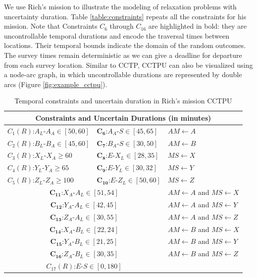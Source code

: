 \documentclass[jair,twoside,11pt,theapa]{article}
\begin{document}
We use Rich's mission to illustrate the modeling of relaxation problems
with uncertainty duration. Table \ref{table:constraints} repeats all the
constraints for his mission. Note that Constraints $C_6$ through $C_{16}$ are
highlighted in bold: they are uncontrollable temporal durations and encode the
traversal times between locations. Their temporal bounds indicate the domain of
the random outcomes. The survey times remain deterministic as we can give a deadline for departure from each survey location. Similar to CCTP, CCTPU can also be visualized using a
node-arc graph, in which uncontrollable durations are represented by double arcs
(Figure \ref{fig:example_cctpu}).

\begin{table}[ht!]	
	\centering
	\begin{tabular}{| m{4.2cm} m{4.2cm} m{4.5cm}|}
		\hline
		\multicolumn{3}{|c|}{\textbf{Constraints and Uncertain Durations (in minutes)}} \\		
		\hline		
		$C_1(R)$:$A_L$-$A_A\in [50,60]$ & $\mathbf{C_6}$:$A_A$-$S\in[45,65]$ & $AM \leftarrow A$ \\ 
		$C_2(R)$:$B_L$-$B_A\in [45,60]$ & $\mathbf{C_7}$:$B_A$-$S\in[30,50]$ & $AM \leftarrow B$ \\ 
		$C_3(R)$:$X_L$-$X_A\geq60$ & $\mathbf{C_8}$:$E$-$X_L\in[28,35]$ & $MS \leftarrow X$ \\ 
		$C_4(R)$:$Y_L$-$Y_A\geq65$ & $\mathbf{C_9}$:$E$-$Y_L\in[30,32]$ & $MS \leftarrow Y$ \\ 
		$C_5(R)$:$Z_L$-$Z_A\geq100$ & $\mathbf{C_{10}}$:$E$-$Z_L\in[50,60]$ & $MS \leftarrow Z$ \\ 
		\hline
		\multicolumn{2}{|c}{$\mathbf{C_{11}}$:$X_A$-$A_L\in[51,54]$} & $AM \leftarrow A$ and $MS \leftarrow X$ \\ 
		\multicolumn{2}{|c}{$\mathbf{C_{12}}$:$Y_A$-$A_L\in[42,45]$} & $AM \leftarrow A$ and $MS \leftarrow Y$ \\ 
		\multicolumn{2}{|c}{$\mathbf{C_{13}}$:$Z_A$-$A_L\in[30,55]$} & $AM \leftarrow A$ and $MS \leftarrow Z$ \\ 
		\multicolumn{2}{|c}{$\mathbf{C_{14}}$:$X_A$-$B_L\in[22,24]$} & $AM \leftarrow B$ and $MS \leftarrow X$ \\ 
		\multicolumn{2}{|c}{$\mathbf{C_{15}}$:$Y_A$-$B_L\in[21,25]$} & $AM \leftarrow B$ and $MS \leftarrow Y$ \\ 
		\multicolumn{2}{|c}{$\mathbf{C_{16}}$:$Z_A$-$B_L\in[30,35]$} & $AM \leftarrow B$ and $MS \leftarrow Z$ \\ \hline
		\multicolumn{2}{|c}{$C_{17}(R)$:$E$-$S\in[0,180]$} & \\
		\hline
	\end{tabular}
	\caption{Temporal constraints and uncertain duration in Rich's mission CCTPU}
	\label{table:stnu_constraints}
\end{table}
\end{document}
